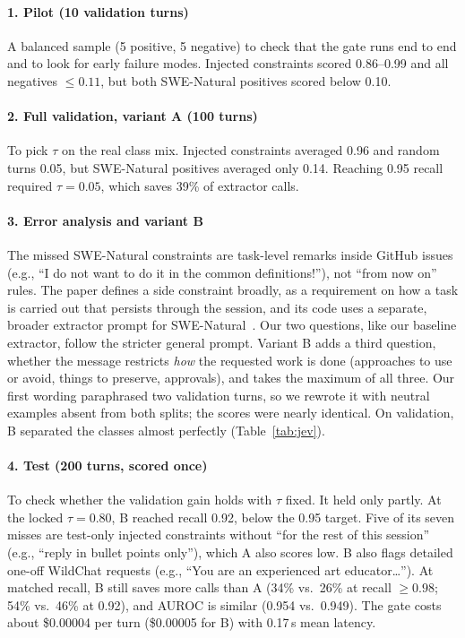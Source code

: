 \paragraph{1. Pilot (10 validation turns)} A balanced sample (5 positive,
5 negative) to check that the gate runs end to end and to look for early
failure modes. Injected constraints scored 0.86--0.99 and all negatives
$\leq 0.11$, but both SWE-Natural positives scored below 0.10.

\paragraph{2. Full validation, variant A (100 turns)} To pick $\tau$ on the
real class mix. Injected constraints averaged 0.96 and random turns 0.05,
but SWE-Natural positives averaged only 0.14. Reaching 0.95 recall required
$\tau=0.05$, which saves 39\% of extractor calls.

\paragraph{3. Error analysis and variant B} The missed SWE-Natural
constraints are task-level remarks inside GitHub issues (e.g., ``I do not
want to do it in the common definitions!''), not ``from now on'' rules. The
paper defines a side constraint broadly, as a requirement on how a task is
carried out that persists through the session, and its code uses a separate,
broader extractor prompt for SWE-Natural~\cite{compactionintegrity}. Our two
questions, like our baseline extractor, follow the stricter general prompt.
Variant B adds a third question, whether the message restricts \emph{how}
the requested work is done (approaches to use or avoid, things to preserve,
approvals), and takes the maximum of all three. Our first wording paraphrased
two validation turns, so we rewrote it with neutral examples absent from both
splits; the scores were nearly identical. On validation, B separated the
classes almost perfectly (Table~\ref{tab:jev}).

\paragraph{4. Test (200 turns, scored once)} To check whether the validation
gain holds with $\tau$ fixed. It held only partly. At the locked $\tau=0.80$,
B reached recall 0.92, below the 0.95 target. Five of its seven misses are
test-only injected constraints without ``for the rest of this session''
(e.g., ``reply in bullet points only''), which A also scores low. B also
flags detailed one-off WildChat requests (e.g., ``You are an experienced art
educator\ldots''). At matched recall, B still saves more calls than A (34\%
vs.\ 26\% at recall $\geq 0.98$; 54\% vs.\ 46\% at 0.92), and AUROC is
similar (0.954 vs.\ 0.949). The gate costs about \$0.00004 per turn
(\$0.00005 for B) with 0.17\,s mean latency.

